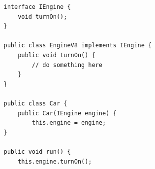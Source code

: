 \documentclass[12pt]{article}
\begin{document}
			\begin{lstlisting}
				interface IEngine {
					void turnOn();
				}
				
				public class EngineV8 implements IEngine {
					public void turnOn() {
						// do something here
					}
				}
				
				public class Car {
					public Car(IEngine engine) {
						this.engine = engine;
				}
				
				public void run() {
					this.engine.turnOn();
			\end{lstlisting}
		
		
		
		
	
		
		






		
\end{document}
